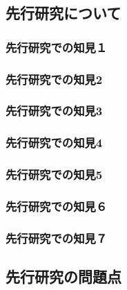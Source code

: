 \documentclass[12pt,a4paper,xelatex,ja=standard]{bxjsarticle}
\begin{document}
\subsection{先行研究について}\label{ux5148ux884cux7814ux7a76ux306bux3064ux3044ux3066}

\subsubsection{先行研究での知見１}\label{ux5148ux884cux7814ux7a76ux3067ux306eux77e5ux898buxff11}

\subsubsection{先行研究での知見2}\label{ux5148ux884cux7814ux7a76ux3067ux306eux77e5ux898b2}

\subsubsection{先行研究での知見3}\label{ux5148ux884cux7814ux7a76ux3067ux306eux77e5ux898b3}

\subsubsection{先行研究での知見4}\label{ux5148ux884cux7814ux7a76ux3067ux306eux77e5ux898b4}

\subsubsection{先行研究での知見5}\label{ux5148ux884cux7814ux7a76ux3067ux306eux77e5ux898b5}

\subsubsection{先行研究での知見６}\label{ux5148ux884cux7814ux7a76ux3067ux306eux77e5ux898buxff16}

\subsubsection{先行研究での知見７}\label{ux5148ux884cux7814ux7a76ux3067ux306eux77e5ux898buxff17}

\subsection{先行研究の問題点}\label{ux5148ux884cux7814ux7a76ux306eux554fux984cux70b9}
\end{document}
